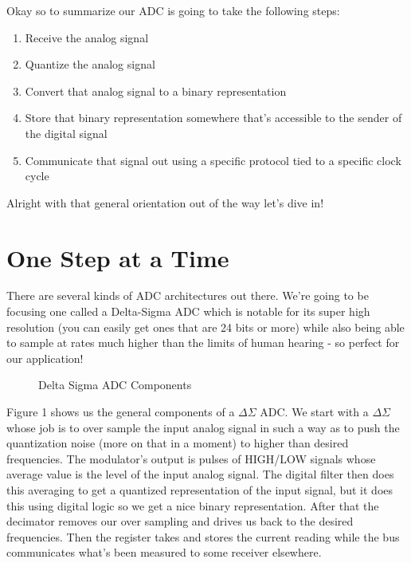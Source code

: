 \documentclass[12pt,a6paper]{book}
\begin{document}
Okay so to summarize our ADC is going to take the following steps:

\begin{enumerate}
\item Receive the analog signal
\item Quantize the analog signal
\item Convert that analog signal to a binary representation
\item Store that binary representation somewhere that's accessible to the sender of the digital signal
\item Communicate that signal out using a specific protocol tied to a specific clock cycle
\end{enumerate}

Alright with that general orientation out of the way let's dive in!

\section{One Step at a Time}
There are several kinds of ADC architectures out there. We're going to be focusing one called a Delta-Sigma ADC which is notable for its super high resolution (you can easily get ones that are 24 bits or more) while also being able to sample at rates much higher than the limits of human hearing - so perfect for our application! 

\begin{figure}[!htb]
\caption{\label{fig:my-label} Delta Sigma ADC Components}
\end{figure}

Figure 1 shows us the general components of a $\Delta \Sigma$ ADC. We start with a $\Delta \Sigma$ whose job is to over sample the input analog signal in such a way as to push the quantization noise (more on that in a moment) to higher than desired frequencies. The modulator's output is pulses of HIGH/LOW signals whose average value is the level of the input analog signal. The digital filter then does this averaging to get a quantized representation of the input signal, but it does this using digital logic so we get a nice binary representation. After that the decimator removes our over sampling and drives us back to the desired frequencies. Then the register takes and stores the current reading while the bus communicates what's been measured to some receiver elsewhere. 
\end{document}
